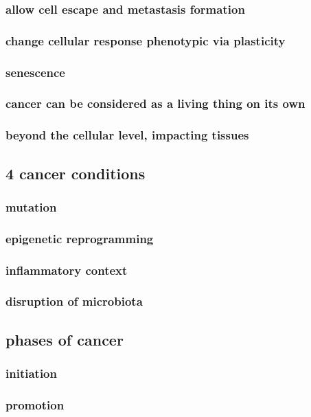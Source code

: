 \subsubsection{allow cell escape and metastasis formation}
\subsubsection{change cellular response phenotypic via plasticity}
\subsubsection{senescence}
  
\subsubsection{cancer can be considered as a living thing on its own}
\subsubsection{beyond the cellular level, impacting tissues}

\subsection{4 cancer conditions}
\subsubsection{mutation}
\subsubsection{epigenetic reprogramming}
\subsubsection{inflammatory context}
\subsubsection{disruption of microbiota}

\subsection{phases of cancer}
\subsubsection{initiation}
\subsubsection{promotion}
